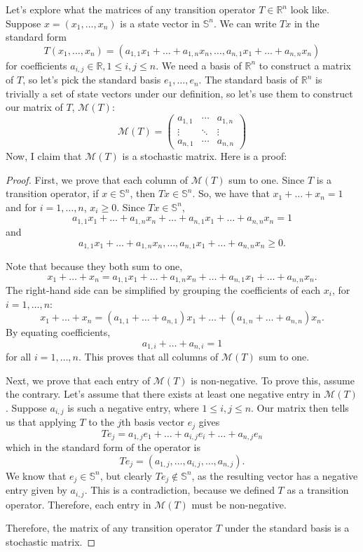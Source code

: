 \documentclass{article}
\newcommand{\R}{\mathbb{R}}
\newcommand{\M}{\mathcal{M}}
\renewcommand{\S}{\mathbb{S}}
\theoremstyle{definition}
\begin{document}
Let's explore what the matrices of any transition operator $T \in \R^n$ look like. Suppose $x = (x_1, \dots, x_n)$ is a state vector in $\S^n$. We can write $Tx$ in the standard form $$T(x_1, \dots, x_n) = (a_{1, 1}x_1 + \dots + a_{1, n}x_n, \dots, a_{n, 1}x_1 + \dots + a_{n, n}x_n)$$ for coefficients $a_{i, j} \in \R, 1 \leq i, j \leq n$. We need a basis of $\R^n$ to construct a matrix of $T$, so let's pick the standard basis $e_1, \dots, e_n$. The standard basis of $\R^n$ is trivially a set of state vectors under our definition, so let's use them to construct our matrix of $T$, $\M(T)$: $$\M(T) = \begin{pmatrix}
    a_{1, 1} & \cdots & a_{1, n} \\
    \vdots & \ddots & \vdots \\
    a_{n, 1} & \cdots & a_{n, n}
\end{pmatrix}$$
Now, I claim that $\M(T)$ is a stochastic matrix. Here is a proof:
\begin{proof}
    First, we prove that each column of $\M(T)$ sum to one. Since $T$ is a transition operator, if $x \in \S^n$, then $Tx \in \S^n$. So, we have that $x_1 + \dots + x_n = 1$ and for $i = 1, \dots, n$, $x_i \geq 0$. Since $Tx \in \S^n$, $$a_{1, 1}x_1 + \dots + a_{1, n}x_n + \dots + a_{n, 1}x_1 + \dots + a_{n, n}x_n = 1$$ and $$a_{1, 1}x_1 + \dots + a_{1, n}x_n, \dots, a_{n, 1}x_1 + \dots + a_{n, n}x_n \geq 0.$$

    Note that because they both sum to one, $$x_1 + \dots + x_n = a_{1, 1}x_1 + \dots + a_{1, n}x_n + \dots + a_{n, 1}x_1 + \dots + a_{n, n}x_n.$$ The right-hand side can be simplified by grouping the coefficients of each $x_i$, for $i = 1, \dots, n$: $$x_1 + \dots + x_n = (a_{1, 1} + \dots + a_{n, 1})x_1 + \dots + (a_{1, n} + \dots + a_{n, n})x_n.$$ By equating coefficients, $$a_{1, i} + \dots + a_{n, i} = 1$$ for all $i = 1, \dots, n$. This proves that all columns of $\M(T)$ sum to one.

    Next, we prove that each entry of $\M(T)$ is non-negative. To prove this, assume the contrary. Let's assume that there exists at least one negative entry in $\M(T)$. Suppose $a_{i, j}$ is such a negative entry, where $1 \leq i, j \leq n$. Our matrix then tells us that applying $T$ to the $j$th basis vector $e_j$ gives $$Te_j = a_{1, j}e_1 + \dots + a_{i, j}e_i + \dots + a_{n, j}e_n$$ which in the standard form of the operator is $$Te_j = (a_{1, j}, \dots, a_{i, j}, \dots, a_{n, j}).$$ We know that $e_j \in \S^n$, but clearly $Te_j \not \in \S^n$, as the resulting vector has a negative entry given by $a_{i, j}$. This is a contradiction, because we defined $T$ as a transition operator. Therefore, each entry in $\M(T)$ must be non-negative.

    Therefore, the matrix of any transition operator $T$ under the standard basis is a stochastic matrix.
\end{proof}
\end{document}
